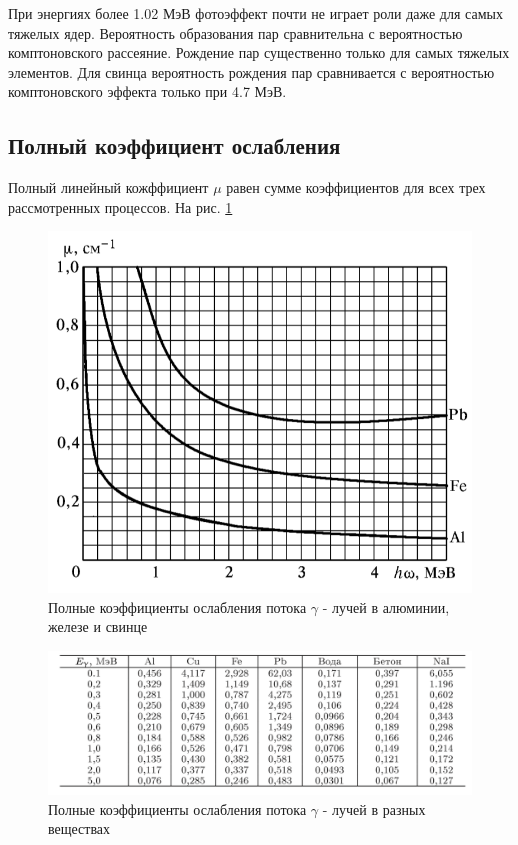 \documentclass[a4paper]{article}
\begin{document}
При энергиях более 1.02 МэВ фотоэффект почти не играет роли даже для самых тяжелых ядер. Вероятность образования пар 
сравнительна с вероятностью комптоновского рассеяние. Рождение пар существенно только для самых тяжелых элементов. 
Для свинца вероятность рождения пар сравнивается с вероятностью комптоновского эффекта только при 4.7 МэВ.



\subsection{Полный коэффициент ослабления}

Полный линейный кожффициент $\mu$ равен сумме коэффициентов для всех трех рассмотренных процессов.
На рис. \ref{p2}

\begin{figure}[H]
    \begin{center}
    \includegraphics[scale = 0.8]{p2.png}
    \caption{Полные коэффициенты ослабления потока $\gamma$ - лучей в алюминии, железе и свинце}
    \label{p2}
    \end{center}
\end{figure}

\begin{figure}[H]
    \begin{center}
    \includegraphics[scale = 0.6]{p3.png}
    \caption{Полные коэффициенты ослабления потока $\gamma$ - лучей в разных веществах}
    \label{p3}
    \end{center}
\end{figure}
\end{document}
